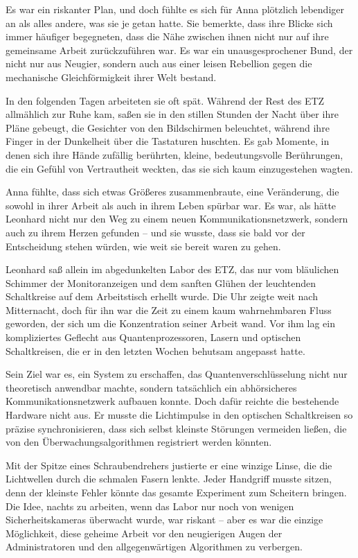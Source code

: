 \documentclass[
]{article}
\begin{document}
Es war ein riskanter Plan, und doch fühlte es sich für Anna plötzlich
lebendiger an als alles andere, was sie je getan hatte. Sie bemerkte,
dass ihre Blicke sich immer häufiger begegneten, dass die Nähe zwischen
ihnen nicht nur auf ihre gemeinsame Arbeit zurückzuführen war. Es war
ein unausgesprochener Bund, der nicht nur aus Neugier, sondern auch aus
einer leisen Rebellion gegen die mechanische Gleichförmigkeit ihrer Welt
bestand.

In den folgenden Tagen arbeiteten sie oft spät. Während der Rest des ETZ
allmählich zur Ruhe kam, saßen sie in den stillen Stunden der Nacht über
ihre Pläne gebeugt, die Gesichter von den Bildschirmen beleuchtet,
während ihre Finger in der Dunkelheit über die Tastaturen huschten. Es
gab Momente, in denen sich ihre Hände zufällig berührten, kleine,
bedeutungsvolle Berührungen, die ein Gefühl von Vertrautheit weckten,
das sie sich kaum einzugestehen wagten.

Anna fühlte, dass sich etwas Größeres zusammenbraute, eine Veränderung,
die sowohl in ihrer Arbeit als auch in ihrem Leben spürbar war. Es war,
als hätte Leonhard nicht nur den Weg zu einem neuen
Kommunikationsnetzwerk, sondern auch zu ihrem Herzen gefunden -- und sie
wusste, dass sie bald vor der Entscheidung stehen würden, wie weit sie
bereit waren zu gehen.

Leonhard saß allein im abgedunkelten Labor des ETZ, das nur vom
bläulichen Schimmer der Monitoranzeigen und dem sanften Glühen der
leuchtenden Schaltkreise auf dem Arbeitstisch erhellt wurde. Die Uhr
zeigte weit nach Mitternacht, doch für ihn war die Zeit zu einem kaum
wahrnehmbaren Fluss geworden, der sich um die Konzentration seiner
Arbeit wand. Vor ihm lag ein kompliziertes Geflecht aus
Quantenprozessoren, Lasern und optischen Schaltkreisen, die er in den
letzten Wochen behutsam angepasst hatte.

Sein Ziel war es, ein System zu erschaffen, das Quantenverschlüsselung
nicht nur theoretisch anwendbar machte, sondern tatsächlich ein
abhörsicheres Kommunikationsnetzwerk aufbauen konnte. Doch dafür reichte
die bestehende Hardware nicht aus. Er musste die Lichtimpulse in den
optischen Schaltkreisen so präzise synchronisieren, dass sich selbst
kleinste Störungen vermeiden ließen, die von den Überwachungsalgorithmen
registriert werden könnten.

Mit der Spitze eines Schraubendrehers justierte er eine winzige Linse,
die die Lichtwellen durch die schmalen Fasern lenkte. Jeder Handgriff
musste sitzen, denn der kleinste Fehler könnte das gesamte Experiment
zum Scheitern bringen. Die Idee, nachts zu arbeiten, wenn das Labor nur
noch von wenigen Sicherheitskameras überwacht wurde, war riskant -- aber
es war die einzige Möglichkeit, diese geheime Arbeit vor den neugierigen
Augen der Administratoren und den allgegenwärtigen Algorithmen zu
verbergen.
\end{document}

